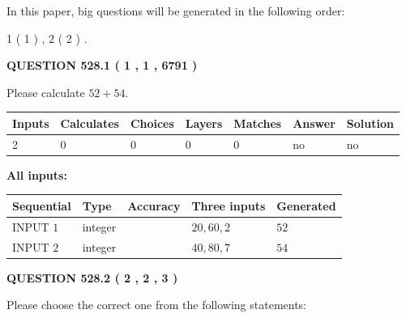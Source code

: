 \documentclass[12pt]{article}
\begin{document}
\vspace{0.2in}
   
In this paper, big questions will be generated in the following order: 
   
   
   1 ( 1 )
 ,
   2 ( 2 )
 .
  
\vspace{0.2in}
  
{\textbf{\Large{QUESTION
528.1 
 ( 1 , 1 , 6791 )
}}}
  
  
 
Please calculate $ %
52 +  %
54 $.
 
 
   
   
   
   
\noindent\begin{tabular}{|l|l|l|l|l|l|l|}
 \hline
Inputs & Calculates & Choices & Layers & Matches & Answer & Solution \\ \hline
 2  & 
 0  & 
 0
  & 
 0  & 
 0  & 
  no & 
  no 
  \\ \hline
 \end{tabular}
   
   
   
   
\noindent{}
   
   
   
   
\noindent\vspace{0.1in}\hspace{-0.08in} {\textbf{\Large{All inputs: }}}
   
   
  
  
\noindent\begin{tabular}{|l|l|l|l|l|}
\hline
 Sequential & Type & Accuracy & Three inputs & Generated \\ 
\hline
 
 
  INPUT $  1 $ & integer &  & $
 20
 , 
 60
 , 
 2
 $ & $ 52 $ 
 \\  \hline  
 
 
  INPUT $  2 $ & integer &  & $
 40
 , 
 80
 , 
 7
 $ & $ 54 $ 
 \\  \hline  
 \end{tabular}
   
   
  
\vspace{0.2in}
  
{\textbf{\Large{QUESTION
528.2 
 ( 2 , 2 , 3 )
}}}
  
  
Please choose the correct one from the following statements:
 
\end{document}
